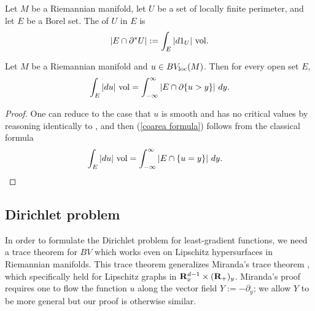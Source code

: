 \begin{definition}
Let $M$ be a Riemannian manifold, let $U$ be a set of locally finite perimeter, and let $E$ be a Borel set.
The  of $U$ in $E$ is
$$|E \cap \partial^* U| := \int_E |d1_U| ~\mathrm{vol}.$$
\end{definition}

\begin{proposition}\label{Coarea2}
Let $M$ be a Riemannian manifold and $u \in BV_{\mathrm{loc}}(M)$. Then for every open set $E$,
\begin{equation}\label{coarea formula}
\int_E |du| ~\mathrm{vol} = \int_{-\infty}^\infty |E \cap \partial \{u > y\}| ~dy.
\end{equation}
\end{proposition}
\begin{proof}
One can reduce to the case that $u$ is smooth and has no critical values by reasoning identically to \cite{Lahti16}, and then (\ref{coarea formula}) follows from the classical formula
\begin{align*}\int_E |du| ~\mathrm{vol} &= \int_{-\infty}^\infty |E \cap \{u = y\}| ~dy. \qedhere \end{align*}
\end{proof}

\subsection{Dirichlet problem}
In order to formulate the Dirichlet problem for least-gradient functions, we need a trace theorem for $BV$ which works even on Lipschitz hypersurfaces in Riemannian manifolds.
This trace theorem generalizes Miranda's trace theorem \cite[Teorema 1]{Miranda67}, which specifically held for Lipschitz graphs in $\mathbf{R}^{d - 1}_x \times (\mathbf{R}_+)_y$.
Miranda's proof requires one to flow the function $u$ along the vector field $Y := -\partial_y$; we allow $Y$ to be more general but our proof is otherwise similar.

